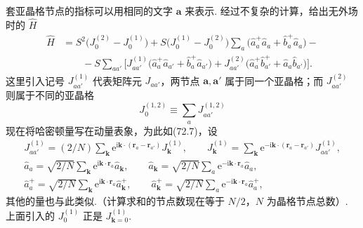 套亚晶格节点的指标可以用相同的文字 $\bm{a}$ 来表示. 经过不复杂的计算，给出无外场时的 $\hat{H}$
\begin{equation*}
\begin{aligned}
\hat{H}&=S^2\bigl(J_0^{(2)}-J_0^{(1)}\bigr)
+S\bigl(J_0^{(1)}-J_0^{(2)}\bigr)\sum_a
\bigl(\hat{a}_a^{+}\hat{a}_a+\hat{b}_a^{+}\hat{a}_a\bigr)-{}\\
&\qquad{}-S\sum_{aa'}\bigl[J_{aa'}^{(1)}\bigl(\hat{a}_a^{+}\hat{a}_{a'}
+\hat{b}_a^{+}\hat{a}_{a'}\bigr)
+J_{aa'}^{(2)}\bigl(\hat{a}_a^{+}\hat{b}_{a'}^{+}
+\hat{a}_a\hat{b}_{a'}\bigr)\bigr].
\end{aligned}
\tag{74*.4}
\end{equation*}
这里引入记号 $J_{aa'}^{(1)}$ 代表矩阵元 $J_{aa'}$，两节点 $\bm{a},\bm{a}'$ 属于同一个亚晶格；而 $J_{aa'}^{(2)}$ 则属于不同的亚晶格
\begin{equation*}
J_0^{(1,2)}\equiv\sum_aJ_{aa'}^{(1,2)}
\end{equation*}
现在将哈密顿量写在动量表象，为此如(72.7)，设
\begin{equation*}
\begin{aligned}
J_{aa'}^{(1)}=(2/N)\sum_{\bm{k}}\mathrm{e}^{\mathrm{i}\bm{k}\cdot(\bm{r}_a-\bm{r}_{a'})}J_{\bm{k}}^{(1)},
\qquad
J_{\bm{k}}^{(1)}=\sum_{\bm{k}}\mathrm{e}^{-\mathrm{i}\bm{k}\cdot(\bm{r}_a-\bm{r}_{a'})}J_{aa'}^{(1)},\\
\hat{a}_a=\sqrt{2/N}\sum_{\bm{k}}\mathrm{e}^{\mathrm{i}\bm{k}\cdot\bm{r}_a}\hat{a}_{\bm{k}},
\qquad
\hat{a}_{\bm{k}}=\sqrt{2/N}\sum_a\mathrm{e}^{-\mathrm{i}\bm{k}\cdot\bm{r}_a}\hat{a}_a,\\
\hat{a}_a^{+}=\sqrt{2/N}\sum_{\bm{k}}\mathrm{e}^{\mathrm{i}\bm{k}\cdot\bm{r}_a}\hat{a}_{\bm{k}}^{+},
\qquad
\hat{a}_{\bm{k}}^{+}=\sqrt{2/N}\sum_a\mathrm{e}^{-\mathrm{i}\bm{k}\cdot\bm{r}_a}\hat{a}_a^{+},
\end{aligned}
\tag{74*.5}
\end{equation*}
其他的量也与此类似.（计算求和的节点数现在等于 $N/2$，$N$ 为晶格节点总数）. 上面引入的 $J_0^{(1)}$ 正是 $J_{\bm{k}=0}^{(1)}$.

